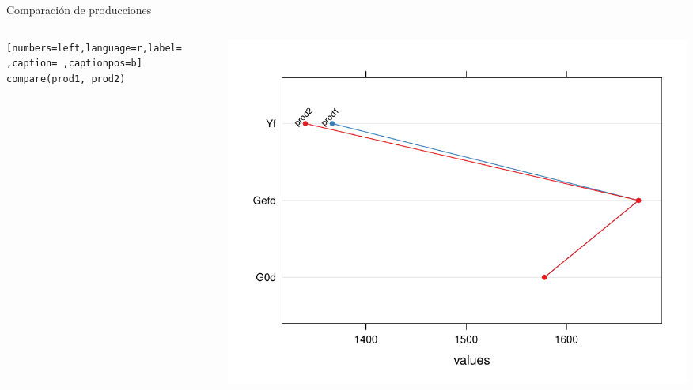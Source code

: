 \documentclass[aspectratio=169, usenames,svgnames,dvipsnames]{beamer}
\begin{document}
\begin{frame}[label={sec:org282466c},fragile]{Comparación de producciones}
 \begin{columns}
\begin{column}{0.35\columnwidth}
\begin{lstlisting}[numbers=left,language=r,label= ,caption= ,captionpos=b]
compare(prod1, prod2)
\end{lstlisting}
\end{column}
\begin{column}{0.65\columnwidth}
\begin{center}
\includegraphics[width=\textwidth]{../figuras/ejemplos4.pdf}
\end{center}
\end{column}
\end{columns}
\end{frame}
\end{document}
